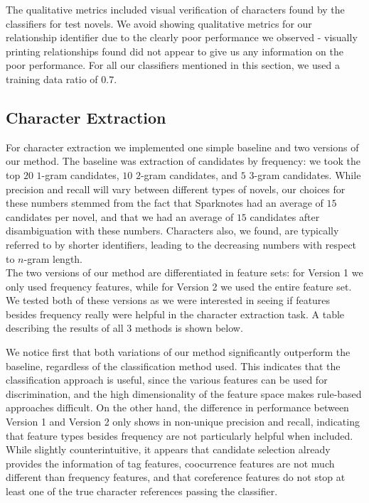 \documentclass[12pt]{article}
\begin{document}
    The qualitative metrics included visual verification of characters found 
    by the classifiers for test novels. We avoid showing qualitative metrics for our 
    relationship identifier due to the clearly poor performance we observed - visually
    printing relationships found did not appear to give us any information on the poor performance. 
    For all our classifiers mentioned in this section, we used a training data ratio of $0.7$. 

    \subsection{Character Extraction}
        
        For character extraction we implemented one simple baseline and two versions of our method.
        The baseline was extraction of candidates by frequency: we took the top $20$ $1$-gram candidates,
        $10$ $2$-gram candidates, and $5$ $3$-gram candidates. While precision and recall will vary
        between different types of novels, our choices for these numbers stemmed
        from the fact that Sparknotes had an average of $15$ candidates per novel, and that we had an average of
        $15$ candidates after disambiguation with these numbers. Characters also, we found, are typically
        referred to by shorter identifiers, leading to the decreasing numbers with respect to $n$-gram length. \\

        The two versions of our method are differentiated in feature sets: for Version 1 we only used
        frequency features, while for Version 2 we used the entire feature set. We tested both of these versions
        as we were interested in seeing if features besides frequency really were helpful in the character
        extraction task. A table describing the results of all $3$ methods is shown below. 


        We notice first that both variations of our method significantly outperform the baseline, regardless
        of the classification method used. This indicates that the classification approach is useful,
        since the various features can be used for discrimination, and the high dimensionality of the feature
        space makes rule-based approaches difficult. On the other hand, the difference in performance
        between Version 1 and Version 2 only shows in non-unique precision and recall, indicating that
        feature types besides frequency are not particularly helpful when included. While slightly
        counterintuitive, it appears that candidate selection already provides the information of tag
        features, coocurrence features are not much different than frequency features, and that coreference
        features do not stop at least one of the true character references passing the classifier. \\
\end{document}
